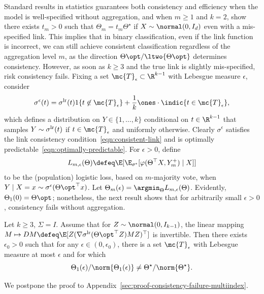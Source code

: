 \documentclass[11pt]{article}
\newcommand{\ind}{{1}}
\newcommand{\lr}{^{\textup{lr}}}  %
\newcommand{\lre}{^{\epsilon}}  %
\newcommand{\sloss}{\varphi}  %
\begin{document}
Standard results in statistics guarantees both consistency and efficiency
when the model is well-specified without aggregation, and when $m \ge 1$ and
$k = 2$, \citet[Prop.~3]{ChengAsDu22} show there exists $t_m > 0$ such that
$\Theta_m = t_m \Theta^\star$
if $X \sim \normal(0, I_d)$ even with a mis-specified link.
%
This implies that in binary classification, even if the link function is
incorrect, we can still achieve consistent classification regardless of
the aggregation level $m$, as the direction $\Theta\opt / \ltwo{\Theta\opt}$
determines consistency.
%
However, as soon as $k \geq 3$ and the true link is slightly
mis-specified, risk consistency fails.
%
Fixing a set $\mc{T}_\epsilon \subset \R^{k-1}$ with Lebesgue
measure $\epsilon$, consider
\begin{align*}
  \sigma\lre (t) = \sigma\lr (t) \ind\{t \not \in \mc{T}_\epsilon\} +
  \frac{1}{k} \ones \cdot \indic{t \in \mc{T}_\epsilon},
\end{align*}
which defines a distribution on $Y \in \{1, \ldots, k\}$
conditional on $t \in \R^{k-1}$ that samples
$Y \sim \sigma\lr(t)$ if $t \in \mc{T}_\epsilon$ and
uniformly otherwise.
%
Clearly $\sigma\lre$ satisfies the link consistency
condition~\eqref{eqn:consistent-link} and is optimally
predictable~\eqref{eqn:optimally-predictable}.
%
For $\epsilon > 0$, define
\begin{equation*}
  L_{m,\epsilon}(\Theta)
  \defeq \E[\E_{\sigma\lre}[\sloss(\Theta^\top X, Y_m^+) \mid X]]
\end{equation*}
to be the (population) logistic loss, based on $m$-majority vote,
when $Y \mid X = x \sim \sigma\lre({\Theta\opt}^\top x)$.
%
Let $\Theta_m(\epsilon) = \argmin_\Theta L_{m,\epsilon}(\Theta)$.
%
Evidently, $\Theta_1(0) = \Theta\opt$; nonetheless, the next result shows
that for arbitrarily small $\epsilon > 0$, consistency fails without
aggregation.
\begin{proposition}
  \label{proposition:consistency-failure-multiindex}
  Let $k \geq 3$, $\Sigma = I$.
  Assume that for $Z \sim \normal(0, I_{k-1})$, the linear mapping $M
  \mapsto D M \defeq \E[Z (\nabla\sigma\lr({\Theta\opt}^\top Z) M Z)^\top]$ is
  invertible.
  Then there exists $\epsilon_0 > 0$ such that for any $\epsilon \in (0,
  \epsilon_0)$, there is a set $\mc{T}_\epsilon$ with
  Lebesgue measure at most $\epsilon$ and for which
  \begin{equation*}
    \Theta_1(\epsilon) / \norm{\Theta_1(\epsilon)} \neq
    \Theta^\star / \norm{\Theta^\star}.
  \end{equation*}
\end{proposition}
\noindent
We postpone the proof to
Appendix~\ref{sec:proof-consistency-failure-multiindex}.
\end{document}
